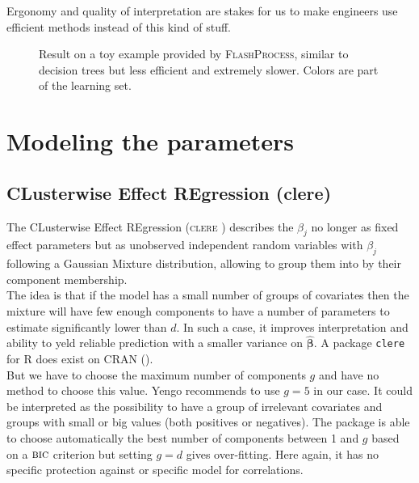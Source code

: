 \documentclass[12pt,a4paper]{report}
\begin{document}
			Ergonomy and quality of interpretation are stakes for us to make engineers use efficient methods instead of this kind of stuff.
	
		\begin{figure}[h!]
	 \quad
	\caption{Result on a toy example provided by \textsc{FlashProcess}, similar to decision trees but less efficient and extremely slower. Colors are part of the learning set.}\label{Regle2D}
\end{figure}	

	\section{Modeling the parameters}			%

		\subsection{CLusterwise Effect REgression ({\sc clere})}		%

			The CLusterwise Effect REgression (\textsc{clere} \cite{yengo2012variable}) describes the $\beta_j$ no longer as fixed effect parameters but as unobserved independent random variables with $\beta_j$ following a Gaussian Mixture distribution, allowing to group them into by their component membership. \\
			
			 The idea is that if the model has a small number of groups of covariates then the mixture will have few enough components to have a number of parameters to estimate significantly lower than $d$. In such a case, it improves interpretation and ability to yeld reliable prediction with a smaller variance on $\boldsymbol{\hat{\beta}}$. A package {\tt clere} for R does exist on CRAN (\cite{packageclere}).%
			 \\
			 
			 But we have to choose the maximum number of components $g$ and have no method to choose this value. Yengo recommends to use $g=5$ in our case. It could be interpreted as the possibility to have a group of irrelevant covariates and groups with small or big values (both positives or negatives). The package is able to choose automatically the best number of components between 1 and $g$ based on a $\mbox{{\sc bic}}$ criterion but setting $g=d$ gives over-fitting.
	 Here again, it has no specific protection against or specific model for correlations. 
\end{document}
